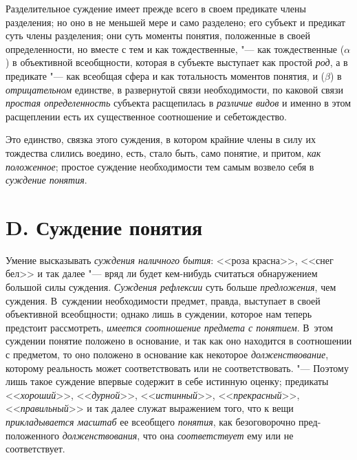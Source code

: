 Разделительное суждение имеет прежде всего в своем предикате
члены разделения; но оно в не меньшей мере и само разделено; его субъект и
предикат суть члены разделения; они суть моменты понятия, положенные в
своей определенности, но вместе с тем и как тождественные, "---
как тождественные ($\alpha $) в объективной всеобщности,
которая в субъекте выступает как простой
{\em род}, а в предикате
"--- как всеобщая сфера и как тотальность моментов понятия, и
($\beta $) в {\em отрицательном}
единстве, в развернутой связи необходимости, по каковой связи
{\em простая определенность}
субъекта расщепилась в
{\em различие видов} и
именно в этом расщеплении есть их существенное соотношение и
себетождество.

Это единство, связка этого суждения, в котором крайние члены в
силу их тождества слились воедино, есть, стало быть, само понятие, и
притом, {\em как положенное};
простое суждение необходимости тем самым возвело себя в
{\em суждение понятия}.

\section[D. Суждение понятия]{D. Суждение понятия}
Умение высказывать
{\em суждения наличного бытия}:
<<роза красна>>, <<снег бел>> и так далее "--- вряд
ли будет кем-нибудь считаться обнаружением большой силы суждения.
{\em Суждения рефлексии}
суть больше
{\em предложения}, чем
суждения. В~суждении необходимости предмет, правда,
выступает в своей объективной всеобщности; однако лишь в суждении, которое
нам теперь предстоит рассмотреть,
{\em имеется соотношение предмета с
понятием}. В~этом суждении понятие положено в основание, и
так как оно находится в соотношении с предметом, то оно положено в
основание как некоторое
{\em долженствование},
которому реальность может соответствовать или не
соответствовать. "--- Поэтому лишь такое суждение впервые
содержит в себе истинную оценку; предикаты
<<{\em хороший}>>,
<<{\em дурной}>>,
<<{\em истинный}>>,
<<{\em прекрасный}>>,
<<{\em правильный}>> и так
далее служат выражением того, что к вещи
{\em прикладывается масштаб} ее всеобщего
{\em понятия}, как
безоговорочно пред-положенного
{\em долженствования},
что она
{\em соответствует} ему
или не соответствует.

